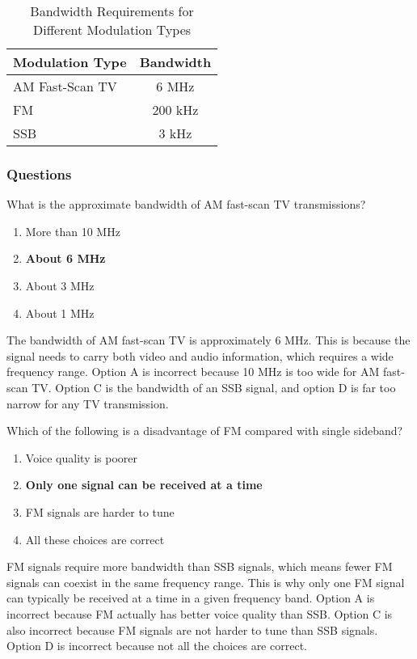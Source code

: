\begin{table}[h]
    \centering
    \begin{tabular}{|l|c|}
        \hline
        \textbf{Modulation Type} & \textbf{Bandwidth} \\
        \hline
        AM Fast-Scan TV & 6 MHz \\
        FM & 200 kHz \\
        SSB & 3 kHz \\
        \hline
    \end{tabular}
    \caption{Bandwidth Requirements for Different Modulation Types}
    \label{tab:bandwidth-requirements}
\end{table}

\subsubsection{Questions}

\begin{tcolorbox}[colback=gray!10!white,colframe=black!75!black,title={T8A10}]
    What is the approximate bandwidth of AM fast-scan TV transmissions?
    \begin{enumerate}[label=\Alph*),noitemsep]
        \item More than 10 MHz
        \item \textbf{About 6 MHz}
        \item About 3 MHz
        \item About 1 MHz
    \end{enumerate}
\end{tcolorbox}

The bandwidth of AM fast-scan TV is approximately 6 MHz. This is because the signal needs to carry both video and audio information, which requires a wide frequency range. Option A is incorrect because 10 MHz is too wide for AM fast-scan TV. Option C is the bandwidth of an SSB signal, and option D is far too narrow for any TV transmission.

\begin{tcolorbox}[colback=gray!10!white,colframe=black!75!black,title={T8A12}]
    Which of the following is a disadvantage of FM compared with single sideband?
    \begin{enumerate}[label=\Alph*),noitemsep]
        \item Voice quality is poorer
        \item \textbf{Only one signal can be received at a time}
        \item FM signals are harder to tune
        \item All these choices are correct
    \end{enumerate}
\end{tcolorbox}

FM signals require more bandwidth than SSB signals, which means fewer FM signals can coexist in the same frequency range. This is why only one FM signal can typically be received at a time in a given frequency band. Option A is incorrect because FM actually has better voice quality than SSB. Option C is also incorrect because FM signals are not harder to tune than SSB signals. Option D is incorrect because not all the choices are correct.
